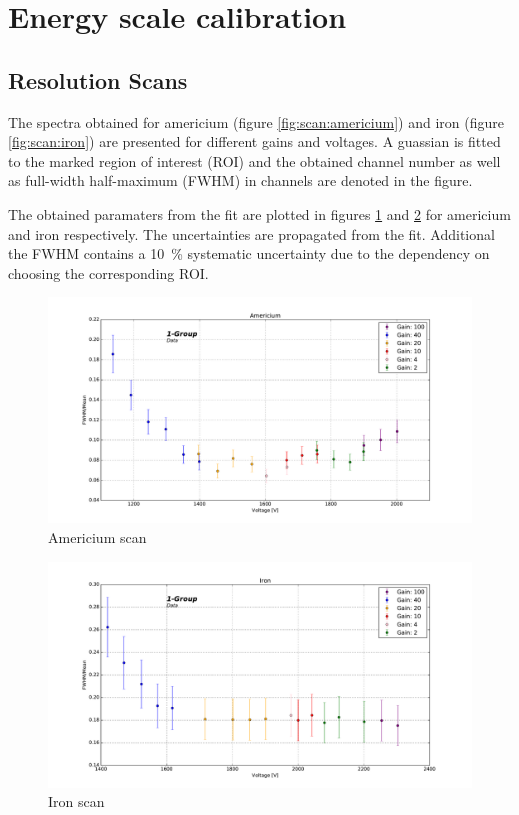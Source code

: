 \section{Energy scale calibration}

\subsection{Resolution Scans}
The spectra obtained for americium (figure \ref{fig:scan:americium}) and iron
(figure \ref{fig:scan:iron}) are presented for different gains and voltages. A
guassian is fitted to the marked region of interest (ROI) and the obtained channel number as well as
full-width half-maximum (FWHM) in channels are denoted in the figure.

The obtained paramaters from the fit are plotted in figures
\ref{fig:resolution:americium} and \ref{fig:resolution:iron} for americium and
iron respectively. The uncertainties are propagated from the fit. Additional the
FWHM contains a \SI{10}{\percent} systematic uncertainty due to the dependency
on choosing the corresponding ROI.

\begin{figure}[htb]
  \includegraphics[width=\linewidth]{graphics/americium_scan}
  \caption{Americium scan}
  \label{fig:resolution:americium}
\end{figure}

\begin{figure}[htb]
  \includegraphics[width=\linewidth]{graphics/iron_scan}
  \caption{Iron scan}
  \label{fig:resolution:iron}
\end{figure}



